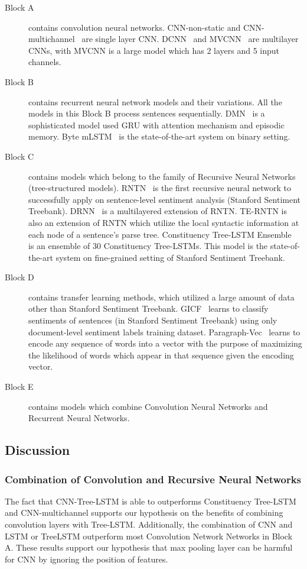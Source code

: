 \begin{description}
	\item[Block A] contains convolution neural networks.
	CNN-non-static and CNN-multichannel~\cite{KimCNN} are single layer CNN.
	DCNN~\cite{DCNN} and MVCNN~\cite{2-layer-cnn} are multilayer CNNs, with MVCNN is a large model  which has 2 layers and 5 input channels.
	\item[Block B] contains recurrent neural network models and their variations.
	All the models in this Block B process sentences sequentially.
	DMN~\cite{attention-gru} is a sophisticated model used GRU with attention mechanism and episodic memory.
	Byte mLSTM~\cite{mlstm} is the state-of-the-art system on binary setting.
	\item[Block C] contains models which belong to the family of Recursive Neural Networks (tree-structured models).
	RNTN~\cite{socher2013recursive} is the first recursive neural network to successfully apply on sentence-level sentiment analysis (Stanford Sentiment Treebank).
	DRNN~\cite{IrsoyDRNN} is a multilayered extension of RNTN.
	TE-RNTN is also an extension of RNTN which utilize the local syntactic information at each node of a sentence's parse tree.
	Constituency Tree-LSTM Ensemble~\cite{LooksHHN17} is an ensemble of 30 Constituency Tree-LSTMs.
	This model is the state-of-the-art system on fine-grained setting of Stanford Sentiment Treebank.
	\item[Block D] contains transfer learning methods, which utilized a large amount of data other than Stanford Sentiment Treebank.
	GICF~\cite{group-instance} learns to classify sentiments of sentences (in Stanford Sentiment Treebank) using only document-level sentiment labels training dataset.
	Paragraph-Vec~\cite{ParagraphVec} learns to encode any sequence of words into a vector with the purpose of maximizing the likelihood of words which appear in that sequence given the encoding vector.
	\item[Block E] contains models which combine Convolution Neural Networks and Recurrent Neural Networks.
\end{description}
\subsection{Discussion}
\subsubsection{Combination of Convolution and Recursive Neural Networks}
The fact that CNN-Tree-LSTM is able to outperforms Constituency Tree-LSTM~\cite{treeLSTM} and CNN-multichannel\cite{KimCNN} supports our hypothesis on the benefits of combining convolution layers with Tree-LSTM.
Additionally, the combination of CNN and LSTM or TreeLSTM outperform most Convolution Network Networks in Block A.
These results support our hypothesis that max pooling layer can be harmful for CNN by ignoring the position of features.
